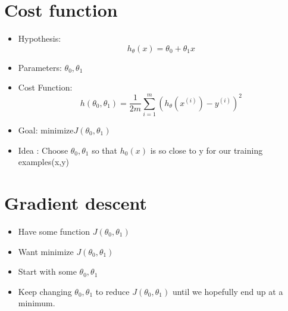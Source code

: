 \documentclass[13pt]{book}
\begin{document}
\section{Cost function}
\begin{itemize}
\item Hypothesis{:}
    \begin{equation}
    h_\theta(x) = \theta_0 + \theta_1x
  \end{equation}
\item Parameters{:}
  \(\theta_0, \theta_1\)
\item Cost Function{:}
  \begin{equation}
    h(\theta_0,\theta_1) = \frac{1}{2m}\sum_{i=1}^m(h_\theta(x^{(i)}) - y^{(i)})^2
  \end{equation}
  \item Goal{:} minimize\(J(\theta_0, \theta_1)\)
\item Idea {:}
  Choose \(\theta_0, \theta_1\) so that \(h_0(x)\) is so close to y for our training examples(x,y)
\end{itemize}

\section{Gradient descent}
\begin{itemize}
  \item Have some function \(J(\theta_0, \theta_1)\) 
  \item Want minimize \(J(\theta_0, \theta_1)\) 
  \item Start with some \(\theta_0, \theta_1\)
  \item Keep changing \(\theta_0, \theta_1\) to reduce \(J(\theta_0, \theta_1)\) until we hopefully end up at a minimum.
\end{itemize}
\end{document}
